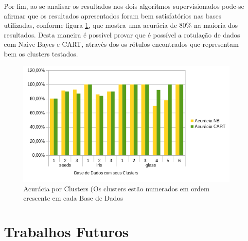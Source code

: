 Por fim, ao se analisar os resultados nos dois algoritmos supervisionados pode-se afirmar que os resultados apresentados foram bem satisfatórios nas bases utilizadas, conforme figura \ref{fig:graf:grafico_NB_CART_acuracia}, que mostra uma acurácia de 80\% na maioria dos resultados. Desta maneira é possível provar que é possível a rotulação de dados com Naive Bayes e CART, através dos os rótulos encontrados que representam bem os clusters testados. %

\begin{figure}[h!]
    \centering
        
  \includegraphics[scale=1]{figs/grafico_NB_CART_acuracia.png}
  \caption{Acurácia por Clusters (Os clusters estão numerados em ordem crescente em cada Base de Dados} \label{fig:graf:grafico_NB_CART_acuracia}
\end{figure}





\section{Trabalhos Futuros}\label{cap:fut}

